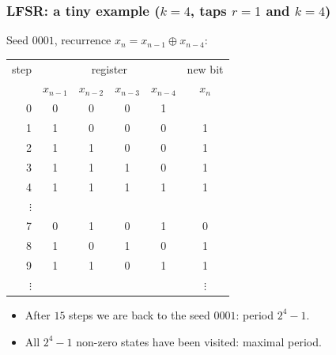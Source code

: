 \documentclass[aspectratio=169]{beamer}
\def\blue{\color{blue}}
\begin{document}
	\begin{frame}
		\frametitle{LFSR: a tiny example ($k = 4$, taps $r = 1$ and $k = 4$)}
		
		Seed $0001$, recurrence $x_n = x_{n-1} \oplus x_{n-4}$:
		\begin{center}
			\footnotesize
			\setlength{\tabcolsep}{4pt}
			\begin{tabular}{r|cccc|c}
				step & \multicolumn{4}{c|}{register} & new bit\\
				& $x_{n-1}$ & $x_{n-2}$ & $x_{n-3}$ & $x_{n-4}$ & $x_n$\\
				\hline
				0 & 0 & 0 & 0 & 1 & \text{--}\\
				1 & 1 & 0 & 0 & 0 & 1\\
				2 & 1 & 1 & 0 & 0 & 1\\
				3 & 1 & 1 & 1 & 0 & 1\\
				4 & 1 & 1 & 1 & 1 & 1\\
				$\vdots$ & & & & & \\
				7 & 0 & 1 & 0 & 1 & 0\\
				8 & 1 & 0 & 1 & 0 & 1\\
				9 & 1 & 1 & 0 & 1 & 1\\
				$\vdots$ & & & & & $\vdots$
			\end{tabular}
		\end{center}
		
		\begin{itemize}
			\item
			After $15$ steps we are back to the seed $0001$: period $2^4 - 1$.
			\item
			All $2^4-1$ {\blue non-zero} states have been visited: {\blue maximal period}.
		\end{itemize}
		
	\end{frame}
	
\end{document}
